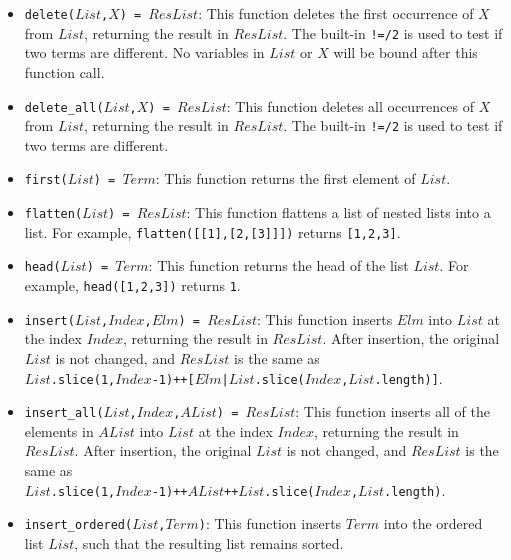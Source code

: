 \begin{itemize}
\item \texttt{delete($List$,$X$) = $ResList$}: This function deletes the first occurrence of $X$ from $List$, returning the result in $ResList$. The built-in \verb+!=/2+ is used to test if two terms are different. No variables in $List$ or $X$ will be bound after this function call.
\item \texttt{delete\_all($List$,$X$) = $ResList$}: This function deletes all occurrences of $X$ from $List$, returning the result in $ResList$. The built-in \verb+!=/2+ is used to test if two terms are different.
\item \texttt{first($List$) = $Term$}: This function returns the first element of $List$. 
\item \texttt{flatten($List$) = $ResList$}: This function flattens a list of nested lists into a list. For example, \texttt{flatten([[1],[2,[3]]])} returns \texttt{[1,2,3]}.
\item \texttt{head($List$) = $Term$}: This function returns the head of the list $List$. For example, \texttt{head([1,2,3])} returns \texttt{1}.
\item \texttt{insert($List$,$Index$,$Elm$) = $ResList$}: This function inserts $Elm$ into $List$ at the index $Index$, returning the result in $ResList$. After insertion, the original $List$ is not changed, and $ResList$ is the same as \\ \texttt{$List$.slice(1,$Index$-1)++[$Elm$|$List$.slice($Index$,$List$.length)]}.
\item \texttt{insert\_all($List$,$Index$,$AList$) = $ResList$}: This function inserts all of the elements in $AList$ into $List$ at the index $Index$, returning the result in $ResList$. After insertion, the original $List$ is not changed, and $ResList$ is the same as \\ \texttt{$List$.slice(1,$Index$-1)++$AList$++$List$.slice($Index$,$List$.length)}.

\item \texttt{insert\_ordered($List$,$Term$)}: This function inserts $Term$ into the ordered list $List$, such that the resulting list remains sorted.


\end{itemize}
